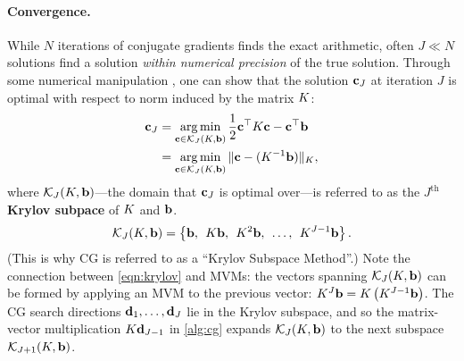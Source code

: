 

\paragraph{Convergence.}
While $N$ iterations of conjugate gradients finds the exact arithmetic, often $J \ll N$ solutions find a solution \emph{within numerical precision} of the true solution.
Through some numerical manipulation \citep[][Ch. 9]{shewchuk1994introduction}, one can show that the solution $\mathbf{c}_J$ at iteration $J$ is optimal with respect to norm induced by the matrix $K$:
%
\begin{align}
  \mathbf{c}_J
  &= \operatorname*{arg\,min}_{\mathbf{c} \in \mathcal{K}_J (K, \mathbf{b})} \frac{1}{2} \mathbf{c}^\top K \mathbf{c} - \mathbf{c}^\top \mathbf{b}
  \nonumber \\
  &= \operatorname*{arg\,min}_{\mathbf{c} \in \mathcal{K}_J (K, \mathbf{b})} \Vert \mathbf{c} - (K^{-1} \mathbf{b}) \Vert_{K},
  \label{eqn:cg_optimality}
\end{align}
%
where $\mathcal{K}_J (K, \mathbf{b})$---the domain that $\mathbf{c}_J$ is optimal over---is referred to as the $J^\text{th}$ {\bf Krylov subpace} of $K$ and $\mathbf{b}$.
%
\begin{equation}
  \mathcal{K}_J (K, \mathbf{b}) = \left\{ \mathbf{b}, \:\: K \mathbf{b}, \:\: K^2 \mathbf{b}, \:\: \ldots, \:\: K^{J-1} \mathbf{b} \right\}.
  \label{eqn:krylov}
\end{equation}
%
(This is why CG is referred to as a ``Krylov Subspace Method''.)
Note the connection between \cref{eqn:krylov} and MVMs:
the vectors spanning $\mathcal{K}_J (K, \mathbf{b})$ can be formed by applying an MVM to the previous vector: $K^J \mathbf{b} = K \left( K^{J-1} \mathbf{b} \right)$.
The CG search directions $\mathbf{d}_1, \ldots, \mathbf{d}_J$ lie in the Krylov subspace, and so the matrix-vector multiplication $K \mathbf{d}_{J-1}$ in \cref{alg:cg} expands $\mathcal{K}_{J}(K, \mathbf{b})$ to the next subspace $\mathcal{K}_{J+1} (K, \mathbf{b})$.

